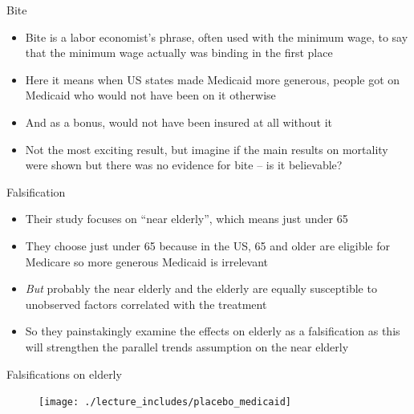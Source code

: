 \documentclass{beamer}
\begin{document}
\begin{frame}{Bite}

\begin{itemize}
\item Bite is a labor economist's phrase, often used with the minimum wage, to say that the minimum wage actually was binding in the first place
\item Here it means when US states made Medicaid more generous, people got on Medicaid who would not have been on it otherwise
\item And as a bonus, would not have been insured at all without it
\item Not the most exciting result, but imagine if the main results on mortality were shown but there was no evidence for bite -- is it believable?
\end{itemize}

\end{frame}






\begin{frame}{Falsification}

\begin{itemize}

\item Their study focuses on ``near elderly'', which means just under 65
\item They choose just under 65 because in the US, 65 and older are eligible for Medicare so more generous Medicaid is irrelevant
\item \emph{But} probably the near elderly and the elderly are equally susceptible to unobserved factors correlated with the treatment
\item So they painstakingly examine the effects on elderly as a falsification as this will strengthen the parallel trends assumption on the near elderly
\end{itemize}

\end{frame}

\begin{frame}{Falsifications on elderly}

	\begin{figure}
\texttt{[image: ./lecture\_includes/placebo\_medicaid]}
	\end{figure}

\end{frame}
\end{document}
